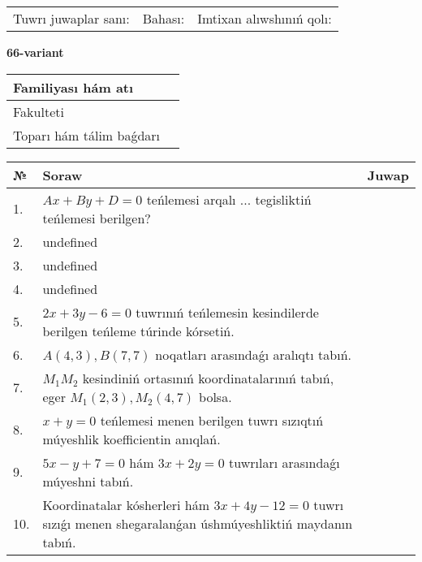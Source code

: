 \documentclass{article}
\begin{document}
\vspace{0.7cm}

\begin{tabular}{lll}
Tuwrı juwaplar sanı: \underline{\hspace{1cm}} & 
Bahası: \underline{\hspace{1cm}} & 
Imtixan alıwshınıń qolı: \underline{\hspace{2cm}} \\
\end{tabular}

\egroup

\newpage


\textbf{66-variant}\\

\bgroup
\def\arraystretch{1.6} %

\begin{tabular}{|m{5.7cm}|m{9.5cm}|}
\hline
Familiyası hám atı & \\
\hline
Fakulteti  & \\
\hline
Toparı hám tálim baǵdarı  & \\
\hline
\end{tabular}

\vspace{0.7cm}

\begin{tabular}{|m{0.7cm}|m{10cm}|m{4cm}|}
\hline
№ & Soraw & Juwap \\
\hline
1. & \(Ax + By + D = 0\) teńlemesi arqalı ... tegisliktiń teńlemesi berilgen? &  \\
\hline
2. & undefined &  \\
\hline
3. & undefined &  \\
\hline
4. & undefined &  \\
\hline
5. & \(2 x + 3 y - 6 = 0\) tuwrınıń teńlemesin kesindilerde berilgen teńleme túrinde kórsetiń. &  \\
\hline
6. & \(A (4, 3), B (7, 7)\) noqatları arasındaǵı aralıqtı tabıń. &  \\
\hline
7. & \(M_{1}M_{2}\) kesindiniń ortasınıń koordinatalarınıń tabıń, eger \(M_{1} (2, 3), M_{2} (4, 7)\) bolsa. &  \\
\hline
8. & \(x + y = 0\) teńlemesi menen berilgen tuwrı sızıqtıń múyeshlik koefficientin anıqlań. &  \\
\hline
9. & \(5 x - y + 7 = 0\) hám \(3 x + 2 y = 0\) tuwrıları arasındaǵı múyeshni tabıń. &  \\
\hline
10. & Koordinatalar kósherleri hám \( 3 x + 4 y - 12 = 0 \) tuwrı sızıǵı menen shegaralanǵan úshmúyeshliktiń maydanın tabıń. & \\
\hline
\end{tabular}
\end{document}

